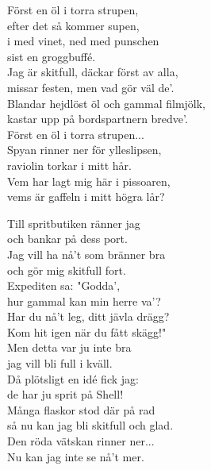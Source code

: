 \documentclass[a6paper, 10pt, twoside]{article}
\begin{document}
Först en öl i torra strupen,\\
efter det så kommer supen,\\
i med vinet, ned med punschen\\
sist en groggbuffé.
\vspace{5pt} \\
Jag är skitfull, däckar först av alla,\\
missar festen, men vad gör väl de'.\\
Blandar hejdlöst öl och gammal filmjölk,\\
kastar upp på bordspartnern bredve'.
\vspace{5pt} \\
Först en öl i torra strupen...
\vspace{5pt} \\
Spyan rinner ner för ylleslipsen,\\
raviolin torkar i mitt hår.\\
Vem har lagt mig här i pissoaren,\\
vems är gaffeln i mitt högra lår?

\begin{center}
\end{center}
\begin{lyrics}
Till spritbutiken ränner jag \\
och bankar på dess port. \\
Jag vill ha nå't som bränner bra \\
och gör mig skitfull fort. \\
Expediten sa: "Godda', \\
hur gammal kan min herre va'? \\
Har du nå't leg, ditt jävla drägg?\\ 
Kom hit igen när du fått skägg!" \\
\newline
Men detta var ju inte bra \\
jag vill bli full i kväll. \\
Då plötsligt en idé fick jag: \\
de har ju sprit på Shell! \\
Många flaskor stod där på rad \\
så nu kan jag bli skitfull och glad.\\ 
Den röda vätskan rinner ner... \\
Nu kan jag inte se nå't mer. 
\end{lyrics}
\end{document}
